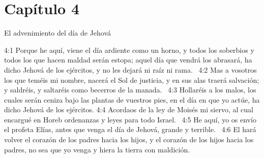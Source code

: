 \section*{Capítulo 4 }
El advenimiento del día de Jehová  

4:1 Porque he aquí, viene el día ardiente como un horno, y todos los soberbios y todos los que hacen maldad serán estopa; aquel día que vendrá los abrasará, ha dicho Jehová de los ejércitos, y no les dejará ni raíz ni rama.  
4:2 Mas a vosotros los que teméis mi nombre, nacerá el Sol de justicia, y en sus alas traerá salvación; y saldréis, y saltaréis como becerros de la manada.  
4:3 Hollaréis a los malos, los cuales serán ceniza bajo las plantas de vuestros pies, en el día en que yo actúe, ha dicho Jehová de los ejércitos. 
4:4 Acordaos de la ley de Moisés mi siervo, al cual encargué en Horeb ordenanzas y leyes para todo Israel.  
4:5 He aquí, yo os envío el profeta Elías, antes que venga el día de Jehová, grande y terrible.  
4:6 El hará volver el corazón de los padres hacia los hijos, y el corazón de los hijos hacia los padres, no sea que yo venga y hiera la tierra con maldición.
